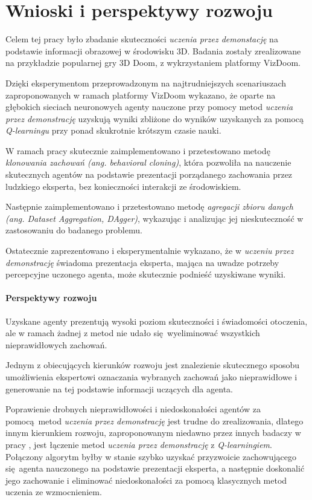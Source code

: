 \chapter{Wnioski i perspektywy rozwoju}

Celem tej pracy było zbadanie skuteczności \textit{uczenia przez demonstację} na podstawie informacji obrazowej w środowisku 3D. Badania zostały zrealizowane na przykładzie popularnej gry 3D Doom, z wykrzystaniem platformy VizDoom.

Dzięki eksperymentom przeprowadzonym na najtrudniejszych scenariuszach zaproponowanych w ramach platformy VizDoom wykazano, że oparte na głębokich sieciach neuronowych agenty nauczone przy pomocy metod \textit{uczenia przez demonstrację} uzyskują wyniki zbliżone do wyników uzyskanych za pomocą \textit{Q-learningu} przy ponad skukrotnie krótszym czasie nauki. 

W ramach pracy skutecznie zaimplementowano i przetestowano metodę \textit{klonowania zachowań (ang. behavioral cloning)}, która pozwoliła na nauczenie skutecznych agentów na podstawie prezentacji porządanego zachowania przez ludzkiego eksperta, bez konieczności interakcji ze środowiskiem.

Następnie zaimplementowano i przetestowano metodę \textit{agregacji zbioru danych (ang. Dataset Aggregation, DAgger)}, wykazując i analizując jej nieskuteczność w zastosowaniu do badanego problemu.

Ostatecznie zaprezentowano i eksperymentalnie wykazano, że w \textit{uczeniu przez demonstrację} świadoma prezentacja eksperta, mająca na uwadze potrzeby percepcyjne uczonego agenta, może skutecznie podnieść uzyskiwane wyniki.

\subsubsection{Perspektywy rozwoju}

Uzyskane agenty prezentują wysoki poziom skuteczności i świadomości otoczenia, ale w ramach żadnej z metod nie udało się wyeliminować wszystkich nieprawidłowych zachowań.

Jednym z obiecujących kierunków rozwoju jest znalezienie skutecznego sposobu umożliwienia ekspertowi oznaczania wybranych zachowań jako nieprawidłowe i generowanie na tej podstawie informacji uczących dla agenta.

Poprawienie drobnych nieprawidłowości i niedoskonałości agentów za pomocą metod \textit{uczenia przez demonstrację} jest trudne do zrealizowania, dlatego innym kierunkiem rozwoju, zaproponowanym niedawno przez innych badaczy w pracy \cite{DBLP:journals/corr/HesterVPLSPSDOA17}, jest łączenie metod \textit{uczenia przez demonstrację} z \textit{Q-learningiem}. Połączony algorytm byłby w stanie szybko uzyskać przyzwoicie zachowującego się agenta nauczonego na podstawie prezentacji eksperta, a następnie doskonalić jego zachowanie i eliminować niedoskonałości za pomocą klasycznych metod uczenia ze wzmocnieniem.



